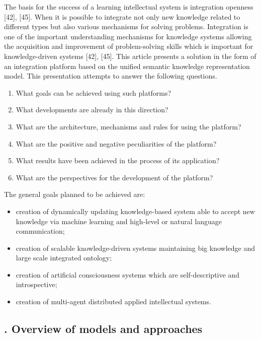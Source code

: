 \documentclass[10pt,twocolumn]{article}
\newcommand{\RomanNumeralCaps}[1]
    {\MakeUppercase{\romannumeral #1}}
\begin{document}
\small The basis for the success of a learning intellectual
system is integration openness [42], [45]. When it is
possible to integrate not only new knowledge related to
different types but also various mechanisms for solving
problems. Integration is one of the important understanding mechanisms for knowledge systems allowing the
acquisition and improvement of problem-solving skills
which is important for knowledge-driven systems [42],
[45]. This article presents a solution in the form of
an integration platform based on the unified semantic
knowledge representation model. This presentation attempts to answer the following questions.
\begin{enumerate} 
  \item What goals can be achieved using such platforms?
   \vspace{-0.2em}
  \item  What developments are already in this direction?
   \vspace{-0.2em}
  \item   What are the architecture, mechanisms and rules for using the platform?
   \vspace{-0.2em}
  \item  What are the positive and negative peculiarities of the platform?
   \vspace{-0.2em}
  \item  What results have been achieved in the process of its application?
   \vspace{-0.2em}
  \item  What are the perspectives for the development of the platform?
\end{enumerate}

The general goals planned to be achieved are:

\begin{itemize}
  \item creation of dynamically updating knowledge-based
system able to accept new knowledge via machine
learning and high-level or natural language communication;
 \vspace{-0.2em}
  \item creation of scalable knowledge-driven systems
maintaining big knowledge and large scale integrated ontology;
  \item creation of artificial consciousness systems which
are self-descriptive and introspective;
 \vspace{-0.2em}
  \item creation of multi-agent distributed applied intellectual systems.
\end{itemize}
\begin{center}
\section*{\large\textmd{{\RomanNumeralCaps{2.}}  Overview of models and approaches}}
\vspace{-0.5em}
\end{center}
\end{document}
